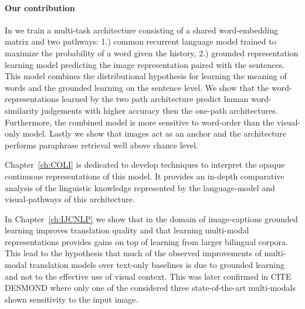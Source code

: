\paragraph{Our contribution}


In \citep{chrupala2015learning} we train a multi-task architecture consisting
of a shared word-embedding matrix and two pathways: 1.) common recurrent language
model trained to maximize the probability of a word given the history,
2.) grounded representation learning model predicting the image representation paired with the sentences.
This model combines the distributional hypothesis for learning the meaning of words
and the grounded learning on the sentence level.
We show that the word-representations learned by the two path architecture
predict human word-similarity judgements with higher accuracy then the one-path
architectures. Furthermore, the combined model is more sensitive to word-order than
the visual-only model.  Lastly we show that images act as an
anchor and the architecture performs paraphrase retrieval well above chance
level.

Chapter~\ref{ch:COLI} is dedicated to develop techniques to interpret the
opaque continuous representations of this model. It provides an in-depth
comparative analysis of the linguistic knowledge represented by the
language-model and visual-pathways of this architecture.

In Chapter~\ref{ch:IJCNLP} we show that in the domain of image-captions
grounded learning improves translation quality and that learning multi-modal
representations provides gains on top of learning from larger bilingual corpora.
This lead to the hypothesis that much of the observed improvements of
multi-modal translation models over text-only baselines is due to grounded
learning and not to the effective use of visual context. This was later confirmed
in CITE DESMOND where only one of the considered three state-of-the-art multi-modals
shown sensitivity to the input image. 


